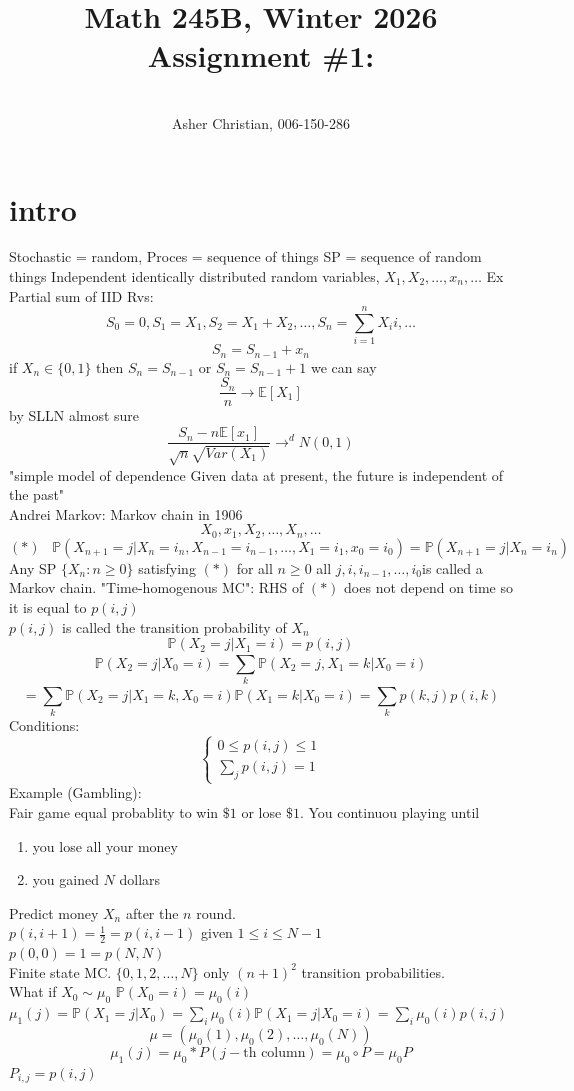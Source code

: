 \documentclass[11pt]{article}
\newcommand{\cnum}{Math 245B}
\newcommand{\ced}{Winter 2026}
\newcommand{\ctitle}[4]{\title{\vspace{-0.5in}\cnum, \ced\\Assignment #1: #2}\author{\vspace{-0.35in}\\#3, #4}}
\begin{document}
\ctitle{\#1}{}{Asher Christian}{006-150-286}
\date{}
\maketitle
\section{intro}
Stochastic = random, Proces = sequence of things
SP = sequence of random things
Independent identically distributed random variables, $X_1,X_2,\dots,x_n,\dots$
Ex Partial sum of IID Rvs:
\[
S_0 = 0, S_1 = X_1, S_2 = X_1 + X_2, \dots, S_n = \sum_{i=1}^{n}X_ii, \dots
\] 
\[
    S_n = S_{n-1} + x_n
\] 
if $X_n \in \{0,1\}$ then  $S_n = S_{n-1}$ or  $S_n = S_{n-1} + 1$ we can say
 \[
     \frac{S_n}{n} \rightarrow \mathbb{E}[X_1]
\] 
by SLLN almost sure
\[
    \frac{S_n - n \mathbb{E}[x_1]}{\sqrt{n}\sqrt{Var(X_1)}} \rightarrow^{d} N(0,1)
\] 
"simple model of dependence Given data at present, the future is independent of the past"\\
Andrei Markov: Markov chain in 1906
\[
X_0,x_1,X_2,\dots,X_n,\dots
\] 
\[
    (*)  \;\;\;  \mathbb{P}(X_{n+1} = j|X_n = i_n, X_{n-1} = i_{n-1}, \dots, X_1 = i_1, x_0 = i_0) = \mathbb{P}(X_{n+1} = j| X_n = i_n)
\] 
Any SP $\{X_n : n \ge 0\}$ satisfying  $(*)$ for all  $n \ge 0$ all  $j,i,i_{n-1},\dots,i_0$is called a Markov chain.
"Time-homogenous MC": RHS of $(*)$ does not depend on time so it is equal to  $p(i,j)$\\
$p(i,j)$ is called the transition probability of $X_n$
 \[
\mathbb{P}(X_2 = j | X_1 = i ) = p(i,j)
\] 
\[
\mathbb{P}(X_2 = j | X_0 = i) = \sum_{k}^{} \mathbb{P}(X_2 = j, X_1 = k | X_0 = i)
\] 
\[
 = \sum_{k}^{} \mathbb{P}(X_2 = j | X_1 = k, X_0 = i) \mathbb{P}(X_1 = k | X_0 =i) = \sum_{k}^{}p(k,j)p(i,k)
\] 
Conditions:
\[
\begin{cases}
    0 \le p(i,j) \le 1 \\
    \sum_{j}^{}p(i,j) = 1
\end{cases}
\]
Example (Gambling):\\
Fair game equal probablity to win $\$1$ or lose  $\$1$. You continuou playing until
\begin{enumerate}
    \item you lose all your money
    \item you gained $N$ dollars
\end{enumerate}
Predict money $X_n$ after the  $n$ round.\\
$p(i,i+1) = \frac{1}{2} = p(i,i-1)$ given $1 \le i \le N-1$\\
$p(0,0) = 1 = p(N,N)$\\
Finite state MC. $\{0,1,2,\dots,N\}$ only  $(n+1)^2$ transition probabilities.\\
What if $X_0 \sim \mu_0$ $ \mathbb{P}(X_0 = i) = \mu_0(i)$
$\mu_1(j) = \mathbb{P}(X_1 = j | X_0) = \sum_{i}^{}\mu_0(i) \mathbb{P}(X_1 = j| X_0 = i) =\sum_{i}^{}\mu_0(i) p(i,j)$
\[
\mu = (\mu_0(1),\mu_0(2),\dots,\mu_0(N))
\] 
\[
    \mu_1(j) = \mu_0 * P(j-\text{th column}) = \mu_0 \circ P=  \mu_0 P
\] 
$P_{i,j} = p(i,j)$
\end{document}
